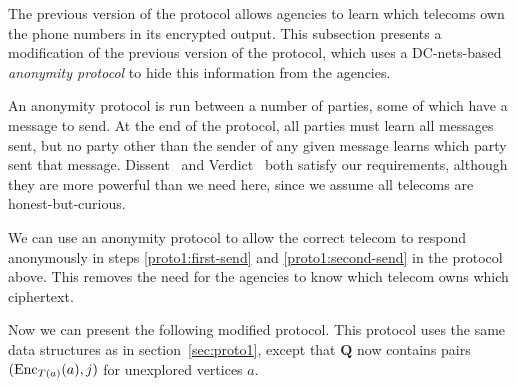 The previous version of the protocol allows agencies to learn which telecoms own the phone numbers in its encrypted output. This subsection presents a modification of the previous version of the protocol, which uses a DC-nets-based \emph{anonymity protocol} to hide this information from the agencies.

An anonymity  protocol is run between a number of parties, some of which have a message to send. At the end of the protocol, all parties must learn all messages sent, but no party other than the sender of any given message learns which party sent that message. Dissent~\cite{dissent} and Verdict~\cite{verdict} both satisfy our requirements, although they are more powerful than we need here, since we assume all telecoms are honest-but-curious.

We can use an anonymity protocol to allow the correct telecom to respond anonymously in steps \ref{proto1:first-send} and \ref{proto1:second-send} in the protocol above. This removes the need for the agencies to know which telecom owns which ciphertext.

Now we can present the following modified protocol. This protocol uses the same data structures as in section~\ref{sec:proto1}, except that $\mathbf{Q}$ now contains pairs $(\operatorname{Enc}_{T(a)}(a), j)$ for unexplored vertices $a$.

